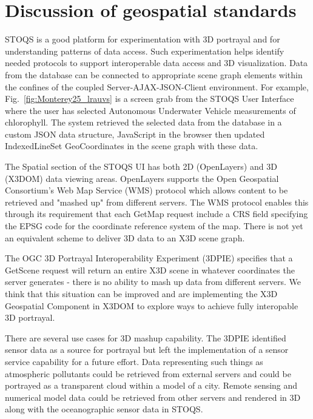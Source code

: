 \documentclass[annualconference]{acmsiggraph}  %
\begin{document}
\section{Discussion of geospatial standards}
STOQS is a good platform for experimentation with 3D portrayal and for understanding patterns of data access. Such experimentation helps identify needed protocols to support interoperable data access and 3D visualization.
Data from the database can be connected to appropriate scene graph elements within the confines of the coupled Server-AJAX-JSON-Client environment. For example, 
Fig.~\ref{fig:Monterey25_lrauvs} is a screen grab from the STOQS User Interface where the user has selected Autonomous Underwater Vehicle measurements of chlorophyll. The system retrieved the selected data from the database in a custom JSON data structure, JavaScript in the browser then updated IndexedLineSet GeoCoordinates in the scene graph with these data. 

The Spatial section of the STOQS UI has both 2D (OpenLayers) and 3D (X3DOM) data viewing areas. OpenLayers supports the Open Geospatial Consortium's Web Map Service (WMS) protocol which allows content to be retrieved and "mashed up" from different servers. The WMS protocol enables this through its requirement that each GetMap request include a CRS field specifying the EPSG code for the coordinate reference system of the map.  There is not yet an equivalent scheme to deliver 3D data to an X3D scene graph.

The OGC 3D Portrayal Interoperability Experiment (3DPIE) \cite{3DPIE} specifies that a GetScene request will return an entire X3D scene in whatever coordinates the server generates - there is no ability to mash up data from different servers. We think that this situation can be improved and are implementing the X3D Geospatial Component in X3DOM to explore ways to achieve fully interopable 3D portrayal.

There are several use cases for 3D mashup capability. The 3DPIE identified sensor data as a source for portrayal but left the implementation of a sensor service capability for a future effort. Data representing such things as atmospheric pollutants could be retrieved from external servers and could be portrayed as a transparent cloud within a model of a city. 
Remote sensing and numerical model data could be retrieved from other servers and rendered in 3D along with the oceanographic sensor data in STOQS.



\nocite{*}

\end{document}
